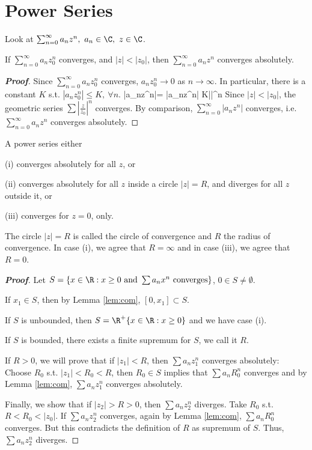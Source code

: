 

\section{Power Series}

Look at $\sum^\infty_{n=0}a_nz^n, \ a_n\in \C,\ z\in\C$.

\begin{lemma}\label{lem:com}
If $\sum^\infty_{n=0}a_nz_0^n$ converges, and $|z|<|z_0|$, then $\sum^\infty_{n=0}a_nz^n$ converges absolutely.
\end{lemma}

\begin{proof}[{\bf Proof}]
Since $\sum^\infty_{n=0}a_nz_0^n$ converges, $a_nz_0^n\to 0$ as $n\to\infty$. In particular, there is a constant $K$ s.t. $|a_nz_0^n|\leq K, \ \forall n$.
\be
|a_nz^n|= \left|a_nz^n\right| \leq K\left|\right|^n
\ee
Since $|z|<|z_0|$, the geometric series $\sum\left|\frac{z}{z_0}\right|^n$ converges. By comparison, $\sum^\infty_{n=0}|a_nz^n|$ converges, i.e. $\sum^\infty_{n=0}a_nz^n$ converges absolutely.
\end{proof}

\begin{theorem}
A power series either

(i) converges absolutely for all $z$, or

(ii) converges absolutely for all $z$ inside a circle $|z|=R$, and diverges for all $z$ outside it, or

(iii) converges for $z=0$, only.
\end{theorem}

\begin{definition}
The circle $|z|=R$ is called the circle of convergence and $R$ the radius of convergence. In case (i), we agree that $R=\infty$ and in case (iii), we agree that $R=0$.
\end{definition}

\begin{proof}[{\bf Proof}]
Let $S=\{x\in \R: x\geq 0 \text{ and }\sum a_n x^n \text{ converges}\}$, $0\in S\neq\emptyset$.

If $x_1 \in S$, then by Lemma \ref{lem:com}, $[0,x_1]\subset S$. 

If $S$ is unbounded, then $S=\R^+\{x\in \R: x\geq 0\}$ and we have case (i).

If $S$ is bounded, there exists a finite supremum for $S$, we call it $R$. 

If $R>0$, we will prove that if $|z_1|<R$, then $\sum a_n z_1^n$ converges absolutely: Choose $R_0$ s.t. $|z_1|<R_0<R$, then $R_0\in S$ implies that $\sum a_n R_0^n$ converges and by Lemma \ref{lem:com}, $\sum a_n z_1^n$ converges absolutely.

Finally, we show that if $|z_2|>R>0$, then $\sum a_n z_2^n$ diverges. Take $R_0$ s.t. $R<R_0<|z_0|$. If $\sum a_n z_2^n$ converges, again by Lemma \ref{lem:com}, $\sum a_n R_0^n$ converges. But this contradicts the definition of $R$ as supremum of $S$. Thus, $\sum a_n z_2^n$ diverges.
\end{proof}

